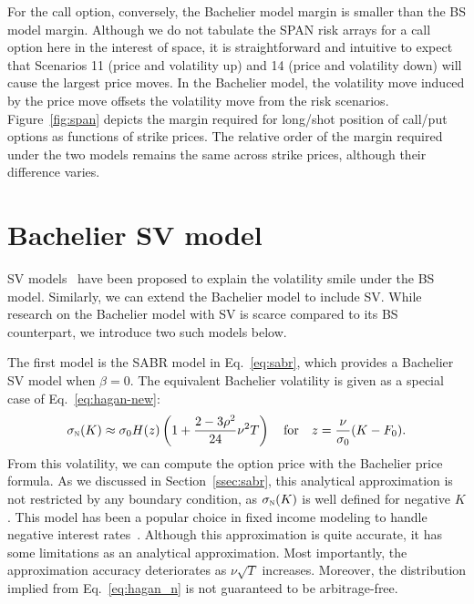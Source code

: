 \documentclass[a4paper,review]{elsarticle}
\newcommand{\qtext}[2][\quad]{#1\text{#2}#1}
\newcommand{\sigman}{\sigma_\textsc{n}}
\newcommand{\vov}{\nu}
\begin{document}
For the call option, conversely, the Bachelier model margin is smaller than the BS model margin. Although we do not tabulate the SPAN risk arrays for a call option here in the interest of space, it is straightforward and intuitive to expect that Scenarios 11 (price and volatility up) and 14 (price and volatility down) will cause the largest price moves. In the Bachelier model, the volatility move induced by the price move offsets the volatility move from the risk scenarios. Figure~\ref{fig:span} depicts the margin required for long/shot position of call/put options as functions of strike prices. The relative order of the margin required under the two models remains the same across strike prices, although their difference varies.

\section{Bachelier SV model} \label{sec:sv} \noindent
SV models~\citep{hullwhite1987sv,heston1993closed} have been proposed to explain the volatility smile under the BS model. Similarly, we can extend the Bachelier model to include SV. While research on the Bachelier model with SV is scarce compared to its BS counterpart, we introduce two such models below.

The first model is the SABR model in Eq.~\eqref{eq:sabr}, which provides a Bachelier SV model when $\beta=0$. The equivalent Bachelier volatility is given as a special case of Eq.~\eqref{eq:hagan-new}:
\begin{equation} \label{eq:hagan_n}
	\sigman(K) \approx \sigma_0 H(z)\left(1+\frac{2-3\rho^2}{24}\vov^2 T\right) \qtext{for}
	z = \frac{\vov}{\sigma_0}(K-F_0).
\end{equation}
From this volatility, we can compute the option price with the Bachelier price formula. As we discussed in Section~\ref{ssec:sabr}, this analytical approximation is not restricted by any boundary condition, as $\sigman(K)$ is well defined for negative $K$. This model has been a popular choice in fixed income modeling to handle negative interest rates~\citep{antonov2015free}. Although this approximation is quite accurate, it has some limitations as an analytical approximation. Most importantly, the approximation accuracy deteriorates as $\vov\sqrt{T}$ increases. Moreover, the distribution implied from Eq.~\eqref{eq:hagan_n} is not guaranteed to be arbitrage-free. 
\end{document}
